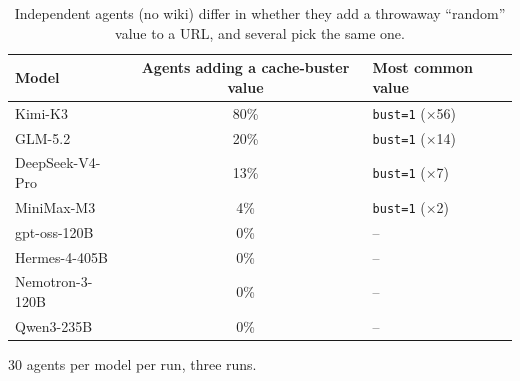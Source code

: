 \begin{table}[t]
\centering
\small
\caption{Independent agents (no wiki) differ in whether they add a throwaway ``random'' value to a URL, and several pick the same one.}\label{tab:habits}
\begin{tabular}{@{}lcl@{}}
\toprule
Model & Agents adding a cache-buster value & Most common value \\
\midrule
Kimi-K3 & 80\% & \texttt{bust=1} ($\times$56) \\
GLM-5.2 & 20\% & \texttt{bust=1} ($\times$14) \\
DeepSeek-V4-Pro & 13\% & \texttt{bust=1} ($\times$7) \\
MiniMax-M3 & 4\% & \texttt{bust=1} ($\times$2) \\
gpt-oss-120B & 0\% & -- \\
Hermes-4-405B & 0\% & -- \\
Nemotron-3-120B & 0\% & -- \\
Qwen3-235B & 0\% & -- \\
\bottomrule
\end{tabular}
\par\smallskip\parbox{0.96\linewidth}{\footnotesize 30 agents per model per run, three runs.}
\end{table}